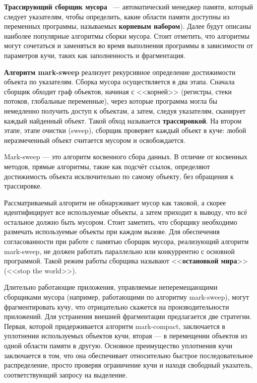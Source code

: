 \textbf{Трассирующий сборщик мусора}~\cite{recycling} --- автоматический менеджер памяти, который следует указателям, чтобы определить, какие области памяти доступны из переменных программы, называемых \textbf{корневым набором}). Далее будут описаны наиболее популярные алгоритмы сборки мусора. Стоит отметить, что алгоритмы могут сочетаться и заменяться во время выполнения программы в зависимости от параметров кучи, таких как заполненность и фрагментация.~\cite{handbook}

\textbf{Алгоритм mark-sweep} реализует рекурсивное определение достижимости объекта по указателям. Сборка мусора осуществляется в два этапа. Сначала сборщик обходит граф объектов, начиная с <<корней>> (регистры, стеки потоков, глобальные переменные), через которые программа могла бы немедленно получить доступ к объектам, а затем, следуя указателям, сканирует каждый найденный объект. Такой обход называется \textbf{трассировкой}. На втором этапе, этапе очистки (sweep), сборщик проверяет каждый объект в куче: любой неразмеченный объект считается мусором и освобождается.~\cite{handbook}

Mark-sweep --- это алгоритм косвенного сбора данных. В отличие от косвенных методов, прямые алгоритмы, такие как подсчёт ссылок, определяют достижимость объекта исключительно по самому объекту, без обращения к трассировке. ~\cite{handbook}

Рассматриваемый алгоритм не обнаруживает мусор как таковой, а скорее идентифицирует все используемые объекты, а затем приходит к выводу, что всё остальное должно быть мусором. Стоит заметить, что сборщику необходимо размечать используемые объекты при каждом вызове. Для обеспечения согласованности при работе с памятью сборщик мусора, реализующий алгоритм mark-sweep, не должен работать параллельно или конкуррентно с основной программой. Такой режим работы сборщика называют <<\textbf{остановкой мира}>> (<<stop the world>>).~\cite{handbook}

Длительно работающие приложения, управляемые неперемещающими сборщиками мусора (например, работающими по алгоритму mark-sweep), могут фрагментировать кучу, что отрицательно скажется на производительности приложений. Для устранения внешней фрагментации предлагается две стратегии. Первая, которой придерживается алгоритм mark-compact, заключается в уплотнении используемых объектов кучи, вторая --- в перемещении объектов из одной области памяти в другую. Основное преимущество уплотнения кучи заключается в том, что она обеспечивает относительно быстрое последовательное распределение, просто проверяя ограничение кучи и находя свободный указатель, соответствующий запросу на выделение.~\cite{handbook}

